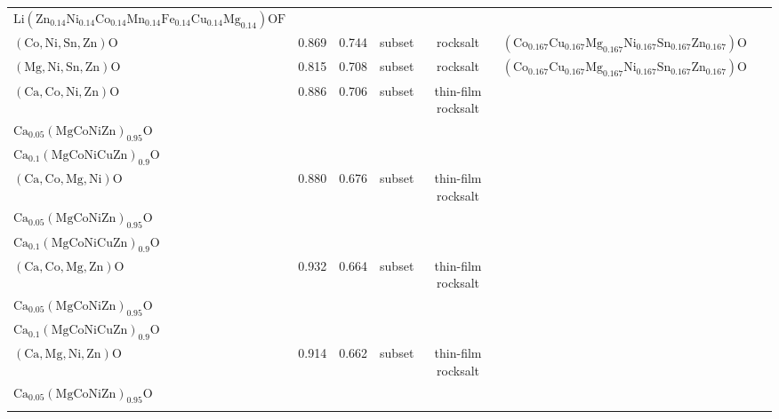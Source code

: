 \begin{table}
{\begin{tabular}{lcccccr}
{$\mathrm{Li}(\mathrm{Zn}_{0.14}\mathrm{Ni}_{0.14}\mathrm{Co}_{0.14}\mathrm{Mn}_{0.14}\mathrm{Fe}_{0.14}\mathrm{Cu}_{0.14}\mathrm{Mg}_{0.14})\mathrm{OF}$} & ~\cite{Lin_MechanochemicalSynthesis_JournalofMaterialsScience_2020} \\
$(\mathrm{Co},\mathrm{Ni},\mathrm{Sn},\mathrm{Zn})\mathrm{O}$ & 0.869 & 0.744 & subset & rocksalt & $(\mathrm{Co}_{0.167}\mathrm{Cu}_{0.167}\mathrm{Mg}_{0.167}\mathrm{Ni}_{0.167}\mathrm{Sn}_{0.167}\mathrm{Zn}_{0.167})\mathrm{O}$ & ~\cite{Braun_ESO_AdvMat_2018} \\
$(\mathrm{Mg},\mathrm{Ni},\mathrm{Sn},\mathrm{Zn})\mathrm{O}$ & 0.815 & 0.708 & subset & rocksalt & 
$(\mathrm{Co}_{0.167}\mathrm{Cu}_{0.167}\mathrm{Mg}_{0.167}\mathrm{Ni}_{0.167}\mathrm{Sn}_{0.167}\mathrm{Zn}_{0.167})\mathrm{O}$ & ~\cite{Braun_ESO_AdvMat_2018} \\
$(\mathrm{Ca},\mathrm{Co},\mathrm{Ni},\mathrm{Zn})\mathrm{O}$ & 0.886 & 0.706 & subset & thin-film rocksalt & \makecell{$\mathrm{Ca}_{0.04}(\mathrm{MgCoNiCuZn})_{0.96}\mathrm{O}$\\
$\mathrm{Ca}_{0.05}(\mathrm{MgCoNiZn})_{0.95}\mathrm{O}$\\
$\mathrm{Ca}_{0.1}(\mathrm{MgCoNiCuZn})_{0.9}\mathrm{O}$}  & ~\cite{Furst_MisfitCation_JournaloftheAmericanCeramicSociety_2026} \\
$(\mathrm{Ca},\mathrm{Co},\mathrm{Mg},\mathrm{Ni})\mathrm{O}$ & 0.880 & 0.676 & subset &  thin-film rocksalt & \makecell{$\mathrm{Ca}_{0.04}(\mathrm{MgCoNiCuZn})_{0.96}\mathrm{O}$\\
$\mathrm{Ca}_{0.05}(\mathrm{MgCoNiZn})_{0.95}\mathrm{O}$\\
$\mathrm{Ca}_{0.1}(\mathrm{MgCoNiCuZn})_{0.9}\mathrm{O}$} & ~\cite{Furst_MisfitCation_JournaloftheAmericanCeramicSociety_2026} \\
$(\mathrm{Ca},\mathrm{Co},\mathrm{Mg},\mathrm{Zn})\mathrm{O}$ & 0.932 & 0.664 & subset & thin-film rocksalt & \makecell{$\mathrm{Ca}_{0.04}(\mathrm{MgCoNiCuZn})_{0.96}\mathrm{O}$\\
$\mathrm{Ca}_{0.05}(\mathrm{MgCoNiZn})_{0.95}\mathrm{O}$\\
$\mathrm{Ca}_{0.1}(\mathrm{MgCoNiCuZn})_{0.9}\mathrm{O}$} & ~\cite{Furst_MisfitCation_JournaloftheAmericanCeramicSociety_2026} \\
$(\mathrm{Ca},\mathrm{Mg},\mathrm{Ni},\mathrm{Zn})\mathrm{O}$ & 0.914 & 0.662 & subset & thin-film rocksalt & \makecell{$\mathrm{Ca}_{0.04}(\mathrm{MgCoNiCuZn})_{0.96}\mathrm{O}$\\
$\mathrm{Ca}_{0.05}(\mathrm{MgCoNiZn})_{0.95}\mathrm{O}$\\
}
\end{tabular}}
\end{table}
